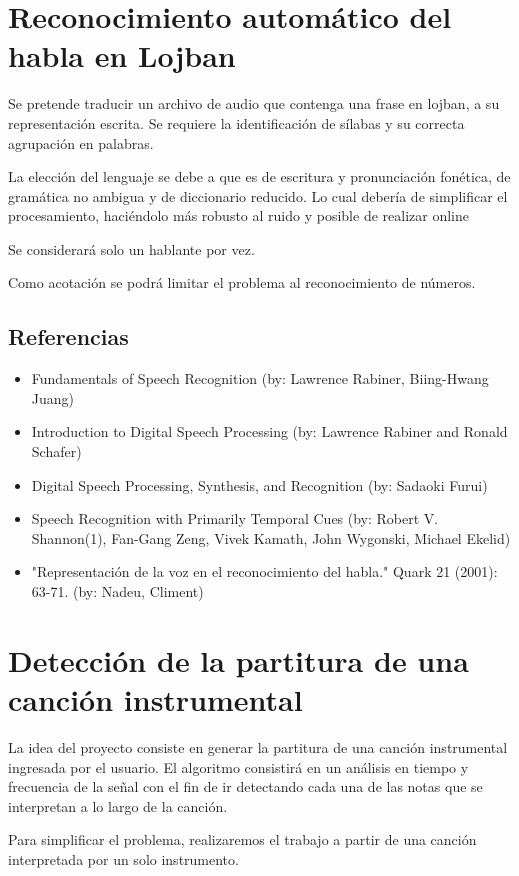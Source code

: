 \documentclass[a4paper,10pt]{article}
\begin{document}
\section*{Reconocimiento automático del habla en Lojban}
	Se pretende traducir un archivo de audio que contenga una frase en lojban, a su representación escrita.
	Se requiere la identificación de sílabas y su correcta agrupación en palabras. 

	La elección del lenguaje se debe a que es de escritura y pronunciación fonética, de gramática no ambigua y de diccionario reducido.
	Lo cual debería de simplificar el procesamiento, haciéndolo más robusto al ruido y posible de realizar online

	Se considerará solo un hablante por vez. 

	Como acotación se podrá limitar el problema al reconocimiento de números.

	\subsection*{Referencias}
		\begin{itemize}
			\item Fundamentals of Speech Recognition (by: Lawrence Rabiner, Biing-Hwang Juang)
			\item Introduction to Digital Speech Processing (by: Lawrence Rabiner and Ronald Schafer)
			\item Digital Speech Processing, Synthesis, and Recognition (by: Sadaoki Furui)
			\item Speech Recognition with Primarily Temporal Cues (by: Robert V. Shannon(1), Fan-Gang Zeng, Vivek Kamath, John Wygonski, Michael Ekelid)
			\item "Representación de la voz en el reconocimiento del habla." Quark 21 (2001): 63-71. (by: Nadeu, Climent)
		\end{itemize}
	
	\clearpage

\section*{Detección de la partitura de una canción instrumental}
	La idea del proyecto consiste en generar la partitura de una canción instrumental ingresada por el usuario. 
	El algoritmo consistirá en un análisis en tiempo y frecuencia  de la señal con el fin de ir detectando cada una de las notas que se interpretan a lo largo de la canción.

	Para simplificar el problema, realizaremos el trabajo a partir de una canción interpretada por un solo instrumento.
\end{document}

